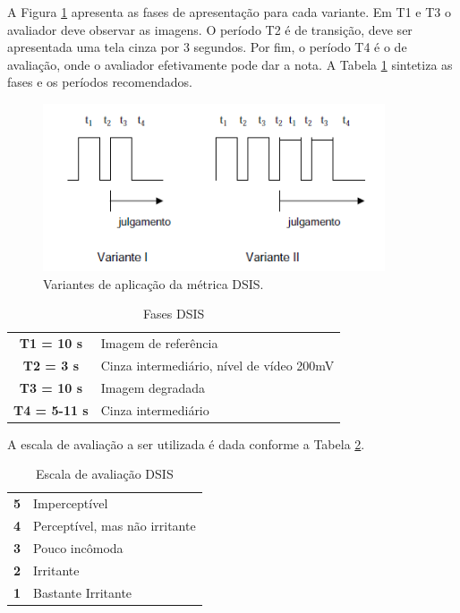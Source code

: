A Figura \ref{fig:dsisvariantes} apresenta as fases de apresentação para cada variante. Em T1 e T3 o avaliador deve observar as imagens. O período T2 é de transição, deve ser apresentada uma tela cinza por 3 segundos. Por fim, o período T4 é o de avaliação, onde o avaliador efetivamente pode dar a nota. A Tabela \ref{tab:dsisfases} sintetiza as fases e os períodos recomendados.

\begin{figure}[!htb]
	\centering
	\includegraphics[width=0.9\textwidth]{./imgs/dsisvariantes.png}
	\caption{Variantes de aplicação da métrica DSIS.}
	\label{fig:dsisvariantes}
\end{figure}

\begin{table}
	\centering
	\caption{Fases DSIS}
	\label{tab:dsisfases}
	\begin{tabular}{c|l}
		\hline
		\textbf{T1 = 10 s} & Imagem de referência \\
		\textbf{T2 = 3 s} & Cinza intermediário, nível de vídeo 200mV \\
		\textbf{T3 = 10 s} & Imagem degradada \\
		\textbf{T4 = 5-11 s} & Cinza intermediário \\
		\hline
	\end{tabular}
\end{table}

A escala de avaliação a ser utilizada é dada conforme a Tabela \ref{tab:dsisescala}.

\begin{table}
	\centering
	\caption{Escala de avaliação DSIS}
	\label{tab:dsisescala}
	\begin{tabular}{c|l}
		\hline
		\textbf{5} & Imperceptível \\
		\textbf{4} & Perceptível, mas não irritante \\
		\textbf{3} & Pouco incômoda \\
		\textbf{2} & Irritante \\
		\textbf{1} & Bastante Irritante \\
		\hline
	\end{tabular}
\end{table}


